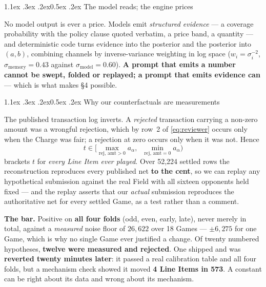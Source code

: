 \documentclass[9pt,a4paper,twocolumn]{article}
\makeatletter
\renewcommand\section{\@startsection{section}{1}{\z@}%
  {1.1ex \@plus .3ex \@minus .2ex}{0.5ex \@plus .2ex}%
  {\normalfont\normalsize\bfseries}}
\newcommand{\charge}{a}
\newcommand{\limitv}{b}
\newcommand{\fair}{t}
\makeatother
\begin{document}
\section{The model reads; the engine prices}

No model output is ever a price. Models emit \emph{structured evidence} --- a coverage probability
with the policy clause quoted verbatim, a price band, a quantity --- and deterministic code turns
evidence into the posterior and the posterior into $(\charge,\limitv)$, combining channels by
inverse-variance weighting in log space ($w_i=\sigma_i^{-2}$, $\sigma_{\text{memory}}=0.43$ against
$\sigma_{\text{model}}=0.60$). \textbf{A prompt that emits a number cannot be swept, folded or
replayed; a prompt that emits evidence can} --- which is what makes \S4 possible.

\section{Why our counterfactuals are measurements}

The published transaction log inverts. A \emph{rejected} transaction carrying a non-zero amount was
a wrongful rejection, which by row~2 of \eqref{eq:reviewer} occurs only when the Charge was fair; a
rejection at zero occurs only when it was not. Hence
\begin{equation}
\boxed{\;\fair\in\Big[\max_{\text{rej},\,\text{amt}>0}\charge_\alpha,\;\;
\min_{\text{rej},\,\text{amt}=0}\charge_\alpha\Big)\;}
\label{eq:inversion}
\end{equation}
brackets $\fair$ for \emph{every Line Item ever played}. Over 52{,}224 settled rows the
reconstruction reproduces every published net \textbf{to the cent}, so we can replay any
hypothetical submission against the real Field with all sixteen opponents held fixed --- and the
replay asserts that our \emph{actual} submission reproduces the authoritative net for every settled
Game, as a test rather than a comment.

\textbf{The bar.} Positive on \textbf{all four folds} (odd, even, early, late), never merely in
total, against a \emph{measured} noise floor of $26{,}622$ over 18 Games --- $\pm6{,}275$ for one
Game, which is why no single Game ever justified a change. Of twenty numbered hypotheses,
\textbf{twelve were measured and rejected}. One shipped and was \textbf{reverted twenty minutes
later}: it passed a real calibration table and all four folds, but a mechanism check showed it
moved \textbf{4 Line Items in 573}. A constant can be right about its data and wrong about its
mechanism.
\end{document}

